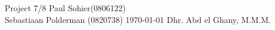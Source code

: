 \documentclass[11pt,a4paper,twoside,dutch]{report}%
\newif\ifpublic \newif\iftwocol %
\begin{document}
\titelblad                   %
  {Project 7/8} %
  {Paul Sohier(0806122) \\ Sebastiaan Polderman (0820738)} %
  {\TI}                      %
  {\today}                   %
  {Dhr. Abd el Ghany, M.M.M.}           %
  {}                         %
\ifpublic
  {\footnotesize{}}
\else
  \tableofcontents         %
\fi
\ifpublic
  \iflanguage{dutch}{\def\bibname{\normalsize{Bronnen}}}
                    {\def\bibname{\normalsize{References}}}
  {\footnotesize{}}   %
\else
\fi
\end{document}
